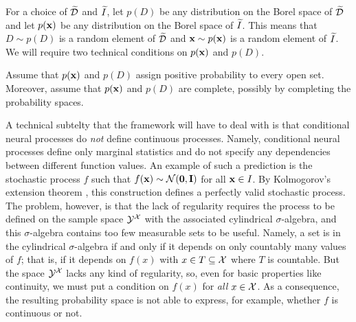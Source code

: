 \documentclass[12pt, twoside]{report}
\begin{document}
For a choice of $\widetilde{\mathcal{D}}$ and $\widetilde{I}$,
let $p(D)$ be any distribution on the Borel space of $\widetilde{\mathcal{D}}$ and let $p(\mathbf{x})$ be any distribution on the Borel space of $\widetilde{I}$.
This means that $D \sim p(D)$ is a random element of $\widetilde{\mathcal{D}}$ and $\mathbf{x} \sim p(\mathbf{x})$ is a random element of $\widetilde{I}$.
We will require two technical conditions on $p(\mathbf{x})$ and $p(D)$.

\begin{assumption} \label{assum:full_support_and_complete}
    Assume that $p(\mathbf{x})$ and $p(D)$ assign positive probability to every open set.
    Moreover, assume that $p(\mathbf{x})$ and $p(D)$ are complete, possibly by completing the probability spaces.
\end{assumption}

A technical subtelty that the framework will have to deal with is that conditional neural processes do \emph{not} define continuous processes.
Namely, conditional neural processes define only marginal statistics and do not specify any dependencies between different function values.
An example of such a prediction is the stochastic process $f$ such that $f(\mathbf{x}) \sim \mathcal{N}(\mathbf{0}, \mathbf{I})$ for all $\mathbf{x} \in I$.
By Kolmogorov's extension theorem \parencite[Theorem 12.1.2;][]{Dudley:2002:Real_Analysis_and_Probability}, this construction defines a perfectly valid stochastic process.
The problem, however, is that the lack of regularity requires the process to be defined on the sample space $\mathcal{Y}^{\mathcal{X}}$ with the associated cylindrical $\sigma$-algebra,
and this $\sigma$-algebra contains too few measurable sets to be useful.
Namely, a set is in the cylindrical $\sigma$-algebra if and only if it depends on only countably many values of $f$;
that is, if it depends on $f(x)$ with $x \in T \subseteq \mathcal{X}$ where $T$ is countable.
But the space $\mathcal{Y}^{\mathcal{X}}$ lacks any kind of regularity, so, even for basic properties like continuity, we must put a condition on $f(x)$ for \emph{all} $x \in \mathcal{X}$.
As a consequence, the resulting probability space is not able to express, for example, whether $f$ is continuous or not.
\end{document}
